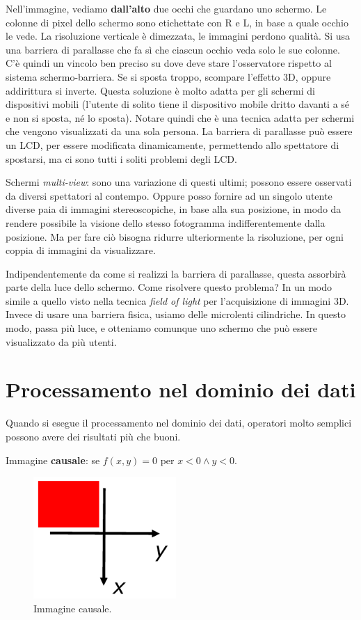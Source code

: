 \documentclass[a4paper,11pt]{article}
\begin{document}
Nell'immagine, vediamo \textbf{dall'alto} due occhi che guardano uno schermo. Le colonne di pixel dello schermo sono etichettate con R e L, in base
a quale occhio le vede. La risoluzione verticale è dimezzata, le immagini perdono qualità. Si usa una barriera di parallasse che fa sì che ciascun occhio
veda solo le sue colonne. C'è quindi un vincolo ben preciso su dove deve stare l'osservatore rispetto al sistema schermo-barriera. Se si sposta troppo,
scompare l'effetto 3D, oppure addirittura si inverte. Questa soluzione è molto adatta per gli schermi di dispositivi mobili (l'utente di solito tiene il dispositivo
mobile dritto davanti a sé e non si sposta, né lo sposta). Notare quindi che è una tecnica adatta per schermi che vengono visualizzati da una sola persona.
La barriera di parallasse può essere un LCD, per essere modificata dinamicamente, permettendo allo spettatore di spostarsi, ma ci sono tutti i soliti problemi degli LCD.
\par
Schermi \textit{multi-view}: sono una variazione di questi ultimi; possono essere osservati da diversi spettatori al contempo.
Oppure posso fornire ad un singolo utente diverse paia di immagini stereoscopiche, in base alla sua posizione, in modo da rendere possibile la visione dello stesso fotogramma
indifferentemente dalla posizione. Ma per fare ciò bisogna ridurre ulteriormente la risoluzione, per ogni coppia di immagini da visualizzare.
\par
Indipendentemente da come si realizzi la barriera di parallasse, questa assorbirà parte della luce dello schermo. Come risolvere questo problema?
In un modo simile a quello visto nella tecnica \textit{field of light} per l'acquisizione di immagini 3D. Invece di usare una barriera fisica, usiamo delle microlenti cilindriche.
In questo modo, passa più luce, e otteniamo comunque uno schermo che può essere visualizzato da più utenti.
\newpage

\section{Processamento nel dominio dei dati}
Quando si esegue il processamento nel dominio dei dati, operatori molto semplici possono avere dei risultati più che buoni.
\par
Immagine \textbf{causale}: se $f(x, y) = 0$ per $x < 0 \land y < 0$.

\renewcommand{\thefigure}{5.1}
\begin{figure}[!h]
  \centering
    \includegraphics[scale=0.4]{images/5/causal_img.png}
    \caption{Immagine causale.}
\end{figure}
\end{document}

